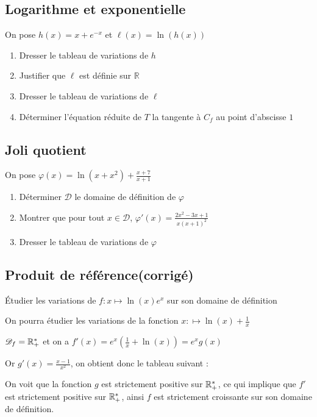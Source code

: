 \documentclass[oneside,12pt]{book}          %
\begin{document}
\subsection{Logarithme et exponentielle}
On pose $h(x) = x+e^{-x}$ et $\ell(x) = \ln(h(x))$

\begin{enumerate}
    \item Dresser le tableau de variations de $h$
    \item Justifier que $\ell$ est définie sur $\mathbb{R}$
    \item Dresser le tableau de variations de $\ell$
    \item Déterminer l'équation réduite de $T$ la tangente à $C_f$ au point d'abscisse $1$
\end{enumerate}


\subsection{Joli quotient}
On pose $\varphi(x) = \ln(x + x^2) + \frac{x + 7}{x + 1}$
\begin{enumerate}
    \item Déterminer $\mathcal{D}$ le domaine de définition de $\varphi$
    \item Montrer que pour tout $x \in \mathcal{D}$, $\varphi'(x) = \frac{2x^2 - 3x + 1}{x(x + 1)^2}$
    \item Dresser le tableau de variations de $\varphi$
\end{enumerate}



\subsection{Produit de référence\quad\small{(corrigé)}}
Étudier les variations de $f:x\mapsto\ln(x)e^x$ sur son domaine de définition

\begin{hint}
On pourra étudier les variations de la fonction $x:\mapsto\ln(x)+\frac{1}{x}$
\end{hint}
\begin{sol}
	${\mathscr{D}}_f={\mathbb R}_+^*$ et on a $f'(x)=e^x\left(\frac{1}{x}+\ln(x)\right)=e^xg(x)$
	
	Or $g'(x)=\frac{x-1}{x^2}$, on obtient donc le tableau suivant :\\
	
	On voit que la fonction $g$ est strictement positive sur ${\mathbb R}_+^*$, ce qui implique que $f'$ est strictement positive sur ${\mathbb R}_+^*$, ainsi $f$ est strictement croissante sur son domaine de définition.
\end{sol}
\end{document}
